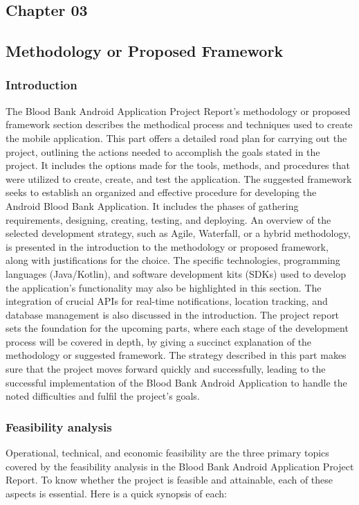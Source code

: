 \begin{center}
    \chapter{Chapter 03}
    
\end{center}
\vspace{11mm}
\section{Methodology or Proposed Framework}
\subsection{ Introduction}
The Blood Bank Android Application Project Report's methodology or proposed
framework section describes the methodical process and techniques used to create the 
mobile application. This part offers a detailed road plan for carrying out the project,
outlining the actions needed to accomplish the goals stated in the project. It includes the
options made for the tools, methods, and procedures that were utilized to create, create,
and test the application. The suggested framework seeks to establish an organized and
effective procedure for developing the Android Blood Bank Application. It includes the
phases of gathering requirements, designing, creating, testing, and deploying. An
overview of the selected development strategy, such as Agile, Waterfall, or a hybrid
methodology, is presented in the introduction to the methodology or proposed framework,
along with justifications for the choice. The specific technologies, programming languages
(Java/Kotlin), and software development kits (SDKs) used to develop the application's
functionality may also be highlighted in this section. The integration of crucial APIs for
real-time notifications, location tracking, and database management is also discussed in
the introduction. The project report sets the foundation for the upcoming parts, where
each stage of the development process will be covered in depth, by giving a succinct
explanation of the methodology or suggested framework. The strategy described in this
part makes sure that the project moves forward quickly and successfully, leading to the
successful implementation of the Blood Bank Android Application to handle the noted
difficulties and fulfil the project's goals.
\subsection{Feasibility analysis}
Operational, technical, and economic feasibility are the three primary topics covered by the
feasibility analysis in the Blood Bank Android Application Project Report. To know whether the
project is feasible and attainable, each of these aspects is essential. Here is a quick synopsis of
each:
